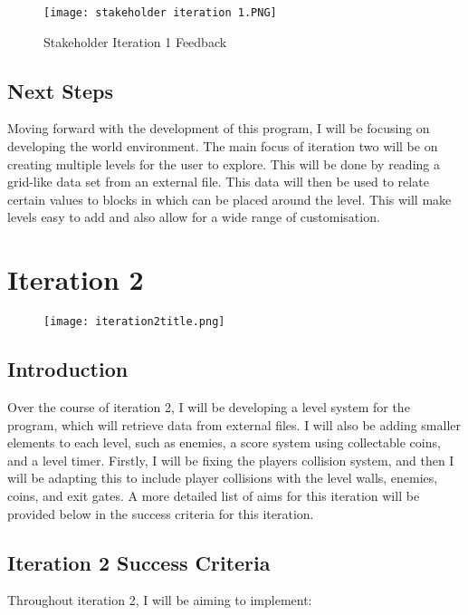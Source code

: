 \documentclass[12pt]{report}
\begin{document}
\begin{figure}[H]
    \centering
    \texttt{[image: stakeholder iteration 1.PNG]}
    \caption{Stakeholder Iteration 1 Feedback}
    \label{stakeholder4}
\end{figure}

\section{Next Steps}
Moving forward with the development of this program, I will be focusing on developing the world environment. The main focus of iteration two will be on creating multiple levels for the user to explore. This will be done by reading a grid-like data set from an external file. This data will then be used to relate certain values to blocks in which can be placed around the level. This will make levels easy to add and also allow for a wide range of customisation.  

\chapter{Iteration 2}

\begin{figure}[H]
    \centering
    \texttt{[image: iteration2title.png]}
    \label{iteration2title}
\end{figure}

\section{Introduction}
Over the course of iteration 2, I will be developing a level system for the program, which will retrieve data from external files. I will also be adding smaller elements to each level, such as enemies, a score system using collectable coins, and a level timer. Firstly, I will be fixing the players collision system, and then I will be adapting this to include player collisions with the level walls, enemies, coins, and exit gates. A more detailed list of aims for this iteration will be provided below in the success criteria for this iteration. 

\section{Iteration 2 Success Criteria}
Throughout iteration 2, I will be aiming to implement:
\end{document}
